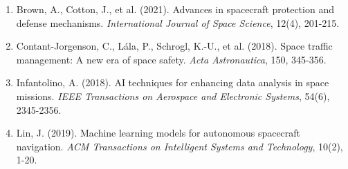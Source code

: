 \documentclass[a4paper,12pt]{article}
\begin{document}
\begin{enumerate}
    \item Brown, A., Cotton, J., et al. (2021). Advances in spacecraft protection and defense mechanisms. \textit{International Journal of Space Science}, 12(4), 201-215.
    
    \item Contant-Jorgenson, C., Lála, P., Schrogl, K.-U., et al. (2018). Space traffic management: A new era of space safety. \textit{Acta Astronautica}, 150, 345-356.
    
    \item Infantolino, A. (2018). AI techniques for enhancing data analysis in space missions. \textit{IEEE Transactions on Aerospace and Electronic Systems}, 54(6), 2345-2356.
    
    \item Lin, J. (2019). Machine learning models for autonomous spacecraft navigation. \textit{ACM Transactions on Intelligent Systems and Technology}, 10(2), 1-20.
\end{enumerate}
\end{document}
